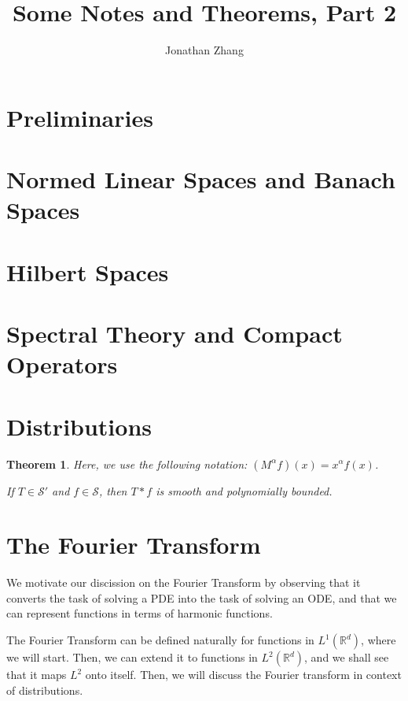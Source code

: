 \documentclass[letterpaper,twoside,12pt]{article}
\theoremstyle{mystyle}
\newtheorem{theorem}{Theorem}[section]
\newcommand{\R}{{\mathbb R}}
\newcommand{\ScS}{\mathcal S}
\begin{document}
\title{\vspace{-2\baselineskip} 
Some Notes and Theorems, Part 2
}
\author{Jonathan Zhang}
\date{}
\maketitle


\section{Preliminaries}
\section{Normed Linear Spaces and Banach Spaces}
\section{Hilbert Spaces}
\section{Spectral Theory and Compact Operators}
\section{Distributions}
\begin{tcolorbox}[colback=red!5!white,colframe=red!75!black]
  \begin{theorem}
    Here, we use the following notation: $\left( {{M^\alpha }f} \right)\left( x \right) = {x^\alpha }f\left( x \right)$.
    
    If $T\in \ScS'$ and $f \in \ScS$, then $T\ast f$ is smooth and polynomially bounded. 
  \end{theorem}
  \end{tcolorbox}
  
  


\newpage\section{The Fourier Transform}

We motivate our discission on the Fourier Transform by observing that it converts the task of solving a PDE into the task of solving an ODE, and that we can represent functions in terms of harmonic functions. 

The Fourier Transform can be defined naturally for functions in $L^1\left( \R^d \right)$, where we will start. Then, we can extend it to functions in $L^2\left( \R^d \right)$, and we shall see that it maps $L^2$ onto itself. Then, we will discuss the Fourier transform in context of distributions. 
\end{document}
